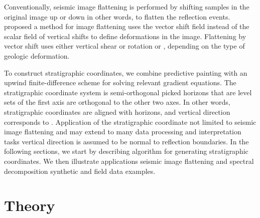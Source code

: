  
Conventionally, seismic image flattening is performed by shifting samples in the original image up or down \new{-} in other words, to flatten the reflection events. \cite{luo2013} proposed a method for image flattening  uses the vector shift field\old{,} instead of the scalar field of vertical shifts to define deformations in the image. Flattening by vector shift uses either vertical shear or rotation or , depending on the type of geologic deformation. 

 To construct stratigraphic coordinates, we combine predictive painting with an upwind finite-difference scheme \cite[]{franklin2001} for solving relevant gradient equations. The stratigraphic coordinate system is semi-orthogonal\new{;}  picked horizons that are level sets of the first axis are orthogonal to the other two axes. In other words, stratigraphic coordinates are aligned with horizons\new{}, and  vertical direction  corresponds to . Application of the stratigraphic coordinate   not limited to seismic image flattening\old{,} and may  extend to many data processing and interpretation tasks   vertical direction is  assumed to be normal to reflection boundaries. In the following sections, we start by describing  algorithm for generating stratigraphic coordinates. We then illustrate applications   seismic image flattening and spectral decomposition  synthetic and field data examples. 


\section{Theory}


